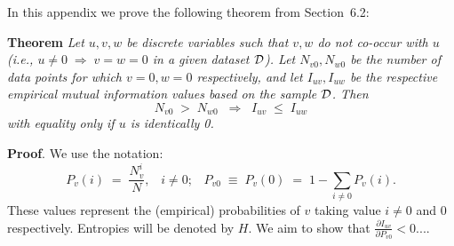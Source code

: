 \documentclass[twoside,11pt]{article}
\newcommand{\dataset}{{\cal D}}
\newcommand{\fracpartial}[2]{\frac{\partial #1}{\partial  #2}}
\begin{document}


In this appendix we prove the following theorem from
Section~6.2:

\noindent
{\bf Theorem} {\it Let $u,v,w$ be discrete variables such that $v, w$ do
not co-occur with $u$ (i.e., $u\neq0\;\Rightarrow \;v=w=0$ in a given
dataset $\dataset$). Let $N_{v0},N_{w0}$ be the number of data points for
which $v=0, w=0$ respectively, and let $I_{uv},I_{uw}$ be the
respective empirical mutual information values based on the sample
$\dataset$. Then
\[
	N_{v0} \;>\; N_{w0}\;\;\Rightarrow\;\;I_{uv} \;\leq\;I_{uw}
\]
with equality only if $u$ is identically 0.} \hfill\BlackBox

\noindent
{\bf Proof}. We use the notation:
\[
P_v(i) \;=\;\frac{N_v^i}{N},\;\;\;i \neq 0;\;\;\;
P_{v0}\;\equiv\;P_v(0)\; = \;1 - \sum_{i\neq 0}P_v(i).
\]
These values represent the (empirical) probabilities of $v$
taking value $i\neq 0$ and 0 respectively.  Entropies will be denoted
by $H$. We aim to show that $\fracpartial{I_{uv}}{P_{v0}} < 0$....\\


\vskip 0.2in

\end{document}
